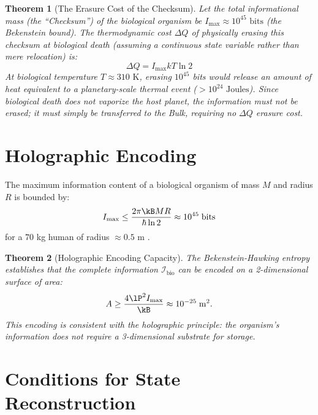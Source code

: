 \documentclass[12pt, a4paper]{article}
\theoremstyle{plain}
\newtheorem{theorem}{Theorem}[section]
\theoremstyle{definition}
\begin{document}
\begin{theorem}[The Erasure Cost of the Checksum]\label{thm:landauer}
Let the total informational mass (the ``Checksum'') of the biological organism be $I_{\max} \approx 10^{45} \text{ bits}$ (the Bekenstein bound). The thermodynamic cost $\Delta Q$ of physically erasing this checksum at biological death (assuming a continuous state variable rather than mere relocation) is:
\begin{equation}
    \Delta Q = I_{\max} kT \ln 2
\end{equation}
At biological temperature $T \approx 310 \text{ K}$, erasing $10^{45}$ bits would release an amount of heat equivalent to a planetary-scale thermal event ($> 10^{24} \text{ Joules}$). Since biological death does not vaporize the host planet, the information \emph{must not be erased}; it must simply be transferred to the Bulk, requiring no $\Delta Q$ erasure cost.
\end{theorem}

\section{Holographic Encoding}\label{sec:encoding}

\begin{proposition}\label{prop:bekenstein}
  The maximum information content of a biological organism of mass $M$
  and radius $R$ is bounded by:
  \begin{equation}\label{eq:bekenstein}
    I_{\max} \leq \frac{2\pi \kB M R}{\hbar \ln 2} \approx 10^{45}
    \; \text{bits}
  \end{equation}
  for a $70$ kg human of radius $\approx 0.5$ m \citep{Bekenstein1981}.
\end{proposition}

\begin{theorem}[Holographic Encoding Capacity]\label{thm:holographic}
  The Bekenstein-Hawking entropy establishes that the complete information
  $\mathcal{I}_{\text{bio}}$ can be encoded on a 2-dimensional surface
  of area:
  \begin{equation}
    A \geq \frac{4 \lP^2 I_{\max}}{\kB} \approx 10^{-25} \; \text{m}^2.
  \end{equation}
  This encoding is consistent with the holographic principle: the
  organism's information does not require a 3-dimensional substrate for
  storage.
\end{theorem}

\section{Conditions for State Reconstruction}\label{sec:reconstruction}
\end{document}
